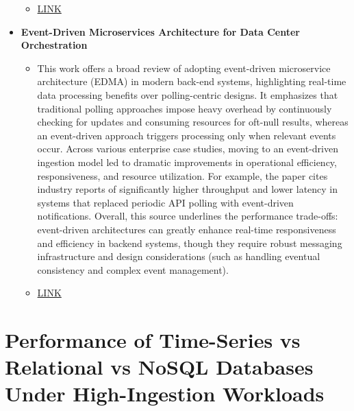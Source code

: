 \documentclass[11pt]{article}
\begin{document}
\begin{itemize}
\begin{itemize}
      \item[] \href{https://www.sciencedirect.com/science/article/pii/S0167739X23003977}{LINK}
  \end{itemize}
  \item[] \textbf{Event-Driven Microservices Architecture for Data Center Orchestration}
  \begin{itemize}
      \item[] This work offers a broad review of adopting event-driven microservice architecture (EDMA) in modern back-end systems, highlighting real-time data processing benefits over polling-centric designs. It emphasizes that traditional polling approaches impose heavy overhead by continuously checking for updates and consuming resources for oft-null results, whereas an event-driven approach triggers processing only when relevant events occur. Across various enterprise case studies, moving to an event-driven ingestion model led to dramatic improvements in operational efficiency, responsiveness, and resource utilization. For example, the paper cites industry reports of significantly higher throughput and lower latency in systems that replaced periodic API polling with event-driven notifications. Overall, this source underlines the performance trade-offs: event-driven architectures can greatly enhance real-time responsiveness and efficiency in backend systems, though they require robust messaging infrastructure and design considerations (such as handling eventual consistency and complex event management). 
      \item[] \href{https://www.ijsat.org/research-paper.php?id=3113}{LINK}
  \end{itemize}
\end{itemize}

\newpage
\section*{Performance of Time-Series vs Relational vs NoSQL Databases Under High-Ingestion Workloads}
\end{document}
